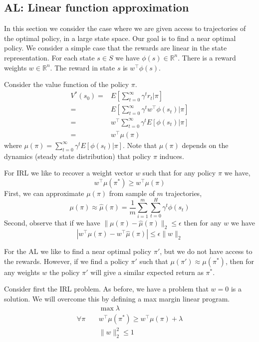 \subsection{AL: Linear function approximation}

In this section we consider the case where we are given access to
trajectories of the optimal policy, in a large state space. Our goal
is to find a near optimal policy.
%
We consider a  simple case that the rewards are linear in the state
representation. For each state $s\in S$ we have
$\phi(s)\in\mathbb{R}^n$. There is a reward weights
$w\in\mathbb{R}^n$. The reward in state $s$ is $w^\top \phi(s)$.

Consider the value function of the policy $\pi$.
\begin{align*}
V^*(s_0) =& E[\sum_{t=0}^\infty \gamma^t r_t|\pi]\\
 =& E[\sum_{t=0}^\infty \gamma^t w^\top \phi(s_t)|\pi]\\
 =& w^\top  \sum_{t=0}^\infty \gamma^tE[ \phi(s_t)|\pi]\\
 =& w^\top \mu(\pi)
\end{align*}
where $\mu(\pi)=\sum_{t=0}^\infty \gamma^tE[ \phi(s_t)|\pi]$. Note
that $\mu(\pi)$ depends on the dynamics (steady state distribution)
that policy $\pi$ induces.

For IRL we like to recover a weight vector $w$ such that for any
policy $\pi$ we have,
\[
w^\top \mu(\pi^*)\geq w^\top \mu(\pi)
\]
First, we can approximate $\mu(\pi)$ from sample of $m$
trajectories,
\[
\mu(\pi)\approx \hat{\mu}(\pi)=\frac{1}{m}\sum_{i=1}^m \sum_{t=0}^H
\gamma^t \phi(s_t)
\]
Second, observe that if we have $\|\mu(\pi)-\hat{\mu}(\pi)\|_2\leq
\epsilon$ then for any $w$ we have
\[
|w^\top \mu(\pi)-w^\top\hat{\mu}(\pi)|\leq \epsilon \|w\|_2
\]

For the AL we like to find a near optimal policy $\pi'$, but we do
not have access to the rewards. However, if we find a policy $\pi'$
such that $\mu(\pi')\approx\mu(\pi^*)$, then for any weights $w$ the
policy $\pi'$ will give a similar expected return as $\pi^*$.

Consider first the IRL problem. As before, we have a problem that
$w=0$ is a solution. We will overcome this by defining a max margin
linear program.
\begin{align*}
& \max \lambda\\
\forall \pi\;\;\;\;  &  w^\top \mu(\pi^*) \geq w^\top\mu(\pi) +\lambda \\
& \|w\|_2^2 \leq 1
\end{align*}

